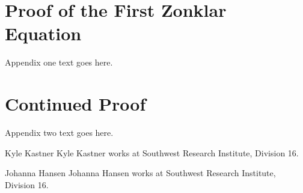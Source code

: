 \documentclass[journal]{IEEEtran}
\begin{document}
%

\appendices
\section{Proof of the First Zonklar Equation}
Appendix one text goes here.

\section{Continued Proof}
Appendix two text goes here.


\begin{IEEEbiographynophoto}{Kyle Kastner}
Kyle Kastner works at Southwest Research Institute, Division 16.
\end{IEEEbiographynophoto}

\begin{IEEEbiographynophoto}{Johanna Hansen}
Johanna Hansen works at Southwest Research Institute, Division 16.
\end{IEEEbiographynophoto}




\end{document}
